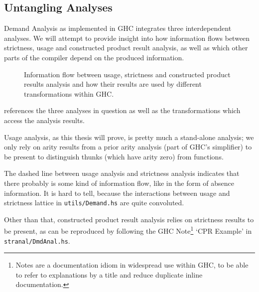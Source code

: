\subsection{Untangling Analyses}\label{sec:untangle}

Demand Analysis as implemented in GHC integrates three interdependent analyses.
We will attempt to provide insight into how information flows between strictness, usage and constructed product result analysis, as well as which other parts of the compiler depend on the produced information.

\begin{figure}[h]
  \centering
  \caption{Information flow between usage, strictness and constructed product results analysis and how their results are used by different transformations within GHC.}
  \label{fig:dmd}
\end{figure}

 references the three analyses in question as well as the transformations which access the analysis results.

Usage analysis, as this thesis will prove, is pretty much a stand-alone analysis; we only rely on arity results from a prior arity analysis (part of GHC's simplifier) to be present to distinguish thunks (which have arity zero) from functions.

The dashed line between usage analysis and strictness analysis indicates that there probably is some kind of information flow, like in the form of absence information. 
It is hard to tell, because the interactions between usage and strictness lattice in \texttt{utils/Demand.hs} are quite convoluted.

Other than that, constructed product result analysis relies on strictness results to be present, as can be reproduced by following the GHC Note\footnote{Notes are a documentation idiom in widespread use within GHC, to be able to refer to explanations by a title and reduce duplicate inline documentation.} `CPR Example' in \texttt{stranal/DmdAnal.hs}.

